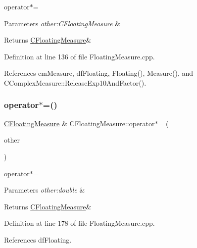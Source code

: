 operator$\ast$= 


\begin{DoxyParams}{Parameters}
{\em other\+:\+C\+Floating\+Measure} & \\
\hline
\end{DoxyParams}
\begin{DoxyReturn}{Returns}
\hyperlink{classCFloatingMeasure}{C\+Floating\+Measure}\& 
\end{DoxyReturn}


Definition at line 136 of file Floating\+Measure.\+cpp.



References cm\+Measure, df\+Floating, Floating(), Measure(), and C\+Complex\+Measure\+::\+Release\+Exp10\+And\+Factor().

\mbox{\label{classCFloatingMeasure_a051879dde322060eb7695667dd38ab13}} 
\subsubsection{\texorpdfstring{operator$\ast$=()}{operator*=()}\hspace{0.1cm}{\footnotesize\ttfamily [2/3]}}
{\footnotesize\ttfamily \hyperlink{classCFloatingMeasure}{C\+Floating\+Measure} \& C\+Floating\+Measure\+::operator$\ast$= (\begin{DoxyParamCaption}\item[{const double \&}]{other }\end{DoxyParamCaption})}



operator$\ast$= 


\begin{DoxyParams}{Parameters}
{\em other\+:double} & \\
\hline
\end{DoxyParams}
\begin{DoxyReturn}{Returns}
\hyperlink{classCFloatingMeasure}{C\+Floating\+Measure}\& 
\end{DoxyReturn}


Definition at line 178 of file Floating\+Measure.\+cpp.



References df\+Floating.

\mbox{\label{classCFloatingMeasure_a076fc9e5cb2f4cf11932e520e0e1f20c}} 
